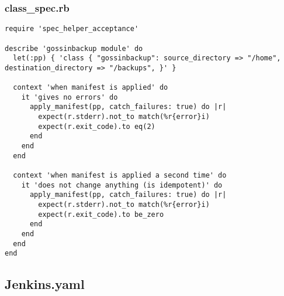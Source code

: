 \subsubsection{class\_spec.rb}

\begin{verbatim}
require 'spec_helper_acceptance'

describe 'gossinbackup module' do
  let(:pp) { 'class { "gossinbackup": source_directory => "/home", destination_directory => "/backups", }' }

  context 'when manifest is applied' do
    it 'gives no errors' do
      apply_manifest(pp, catch_failures: true) do |r|
        expect(r.stderr).not_to match(%r{error}i)
        expect(r.exit_code).to eq(2)
      end
    end
  end

  context 'when manifest is applied a second time' do
    it 'does not change anything (is idempotent)' do
      apply_manifest(pp, catch_failures: true) do |r|
        expect(r.stderr).not_to match(%r{error}i)
        expect(r.exit_code).to be_zero
      end
    end
  end
end
\end{verbatim}

\subsection{Jenkins.yaml} \label{jenkinsyaml}

